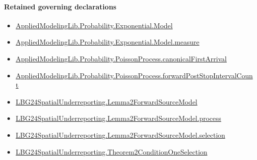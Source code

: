 \documentclass[10pt]{article}
\begin{document}
\paragraph{Retained governing declarations}
\begin{itemize}\raggedright
\item \hyperlink{governing-declaration-82b7914cdb2aa374}{Applied\allowbreak{}Modeling\allowbreak{}Lib.\allowbreak{}Probability.\allowbreak{}Exponential.\allowbreak{}Model}
\item \hyperlink{governing-declaration-204558c62e63ea8d}{Applied\allowbreak{}Modeling\allowbreak{}Lib.\allowbreak{}Probability.\allowbreak{}Exponential.\allowbreak{}Model.\allowbreak{}measure}
\item \hyperlink{governing-declaration-b0f010330c55d613}{Applied\allowbreak{}Modeling\allowbreak{}Lib.\allowbreak{}Probability.\allowbreak{}Poisson\allowbreak{}Process.\allowbreak{}canonical\allowbreak{}First\allowbreak{}Arrival}
\item \hyperlink{governing-declaration-2069441088df424d}{Applied\allowbreak{}Modeling\allowbreak{}Lib.\allowbreak{}Probability.\allowbreak{}Poisson\allowbreak{}Process.\allowbreak{}forward\allowbreak{}Post\allowbreak{}Stop\allowbreak{}Interval\allowbreak{}Count}
\item \hyperlink{governing-declaration-2f059522a9b873ec}{LBG24\allowbreak{}Spatial\allowbreak{}Underreporting.\allowbreak{}Lemma2\allowbreak{}Forward\allowbreak{}Source\allowbreak{}Model}
\item \hyperlink{governing-declaration-d4ebdfd9cf876fb9}{LBG24\allowbreak{}Spatial\allowbreak{}Underreporting.\allowbreak{}Lemma2\allowbreak{}Forward\allowbreak{}Source\allowbreak{}Model.\allowbreak{}process}
\item \hyperlink{governing-declaration-d1966c1bd14884cd}{LBG24\allowbreak{}Spatial\allowbreak{}Underreporting.\allowbreak{}Lemma2\allowbreak{}Forward\allowbreak{}Source\allowbreak{}Model.\allowbreak{}selection}
\item \hyperlink{governing-declaration-b86695ea0bdc7438}{LBG24\allowbreak{}Spatial\allowbreak{}Underreporting.\allowbreak{}Theorem2\allowbreak{}Condition\allowbreak{}One\allowbreak{}Selection}
\end{itemize}
\end{document}
